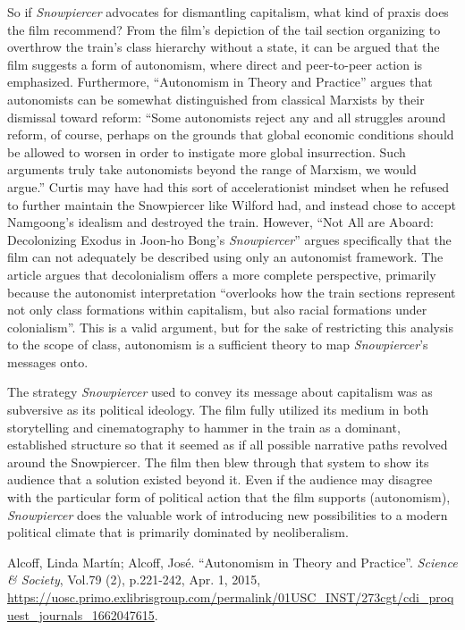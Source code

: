 \documentclass[12pt, letterpaper]{article}
\begin{document}
\begin{mla}
So if \textit{Snowpiercer} advocates for dismantling capitalism, what kind of
praxis does the film recommend? From the film's depiction of the tail section
organizing to overthrow the train's class hierarchy without a state, it can be
argued that the film suggests a form of autonomism, where direct and
peer-to-peer action is emphasized. Furthermore, ``Autonomism in Theory and
Practice'' argues that autonomists can be somewhat distinguished from
classical Marxists by their dismissal toward reform: ``Some autonomists reject
any and all struggles around reform, of course, perhaps on the grounds that
global economic conditions should be allowed to worsen in order to instigate
more global insurrection. Such arguments truly take autonomists beyond the
range of Marxism, we would argue.'' Curtis may have had this sort of
accelerationist mindset when he refused to further maintain the Snowpiercer
like Wilford had, and instead chose to accept Namgoong's idealism and
destroyed the train. However, ``Not All are Aboard: Decolonizing Exodus in
Joon-ho Bong’s \textit{Snowpiercer}'' argues specifically that the film can
not adequately be described using only an autonomist framework. The article
argues that decolonialism offers a more complete perspective, primarily
because the autonomist interpretation ``overlooks how the train sections
represent not only class formations within capitalism, but also racial
formations under colonialism''. This is a valid argument, but for the sake of
restricting this analysis to the scope of class, autonomism is a sufficient
theory to map \textit{Snowpiercer}'s messages onto.

The strategy \textit{Snowpiercer} used to convey its message about capitalism
was as subversive as its political ideology. The film fully utilized its
medium in both storytelling and cinematography to hammer in the train as a
dominant, established structure so that it seemed as if all possible narrative
paths revolved around the Snowpiercer. The film then blew through that system
to show its audience that a solution existed beyond it. Even if the audience
may disagree with the particular form of political action that the film
supports (autonomism), \textit{Snowpiercer} does the valuable work of
introducing new possibilities to a modern political climate that is primarily
dominated by neoliberalism.


\begin{workscited}
	\bibent Alcoff, Linda Mart\'in; Alcoff, Jos\'e. ``Autonomism in Theory and
	Practice''. \textit{Science \& Society}, Vol.79 (2), p.221-242, Apr. 1,
	2015,
	\url{https://uosc.primo.exlibrisgroup.com/permalink/01USC_INST/273cgt/cdi_proquest_journals_1662047615}.
	

\end{workscited}
\end{mla}
\end{document}
